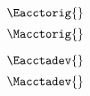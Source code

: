 

\begin{landscape}

\linespread{1}


\sectionsep{}

{
\begin{equation} \label{eq:E_acct_orig}
  \Eacctorig{}
\end{equation}
}
{
\begin{equation} \label{eq:M_acct_orig}
  \Macctorig{}
\end{equation}
}

\sectionsep{}

{
\begin{equation} \label{eq:E_acct_adev}
  \Eacctadev{}
\end{equation}
}
{
\begin{equation} \label{eq:M_acct_adev}
  \Macctadev{}
\end{equation}
}

\sectionsep{}

\derivsection{}
{
~
  
}
\end{landscape}
